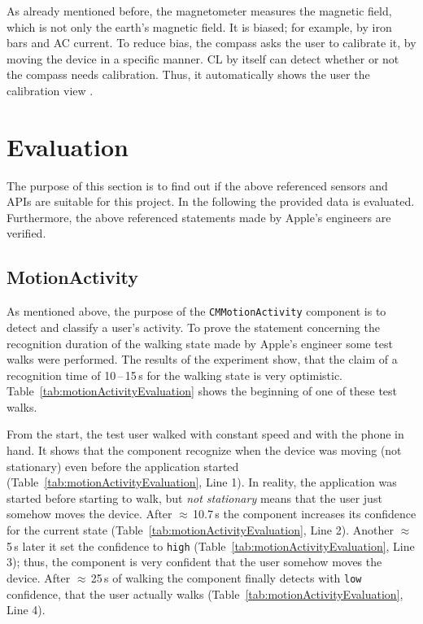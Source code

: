 As already mentioned before, the magnetometer measures the magnetic field, which is not only the earth's magnetic field. It is biased; for example, by iron bars and AC current. To reduce bias, the compass asks the user to calibrate it, by moving the device in a specific manner. \ac{CL} by itself can detect whether or not the compass needs calibration. Thus, it automatically shows the user the calibration view \citep{apple:ios_doc_cl}.


\section{Evaluation}\label{sec:sensor_eval}
The purpose of this section is to find out if the above referenced sensors and \acsp{API} are suitable for this project. In the following the provided data is evaluated. Furthermore, the above referenced statements made by Apple's engineers are verified.


\subsection{MotionActivity}
As mentioned above, the purpose of the \texttt{CMMotionActivity} component is to detect and classify a user's activity. To prove the statement concerning the recognition duration of the walking state made by Apple's engineer \citet{apple:wwdc_2014_pham} some test walks were performed. The results of the experiment show, that the claim of a recognition time of 10\,--\,15\,s for the walking state is very optimistic. Table~\ref{tab:motionActivityEvaluation} shows the beginning of one of these test walks.

From the start, the test user walked with constant speed and with the phone in hand. It shows that the component recognize when the device was moving (not stationary) even before the application started (Table~\ref{tab:motionActivityEvaluation}, Line 1). In reality, the application was started before starting to walk, but \emph{not stationary} means that the user just somehow moves the device. After $\approx$\,10.7\,s the component increases its confidence for the current state (Table~\ref{tab:motionActivityEvaluation}, Line 2). Another $\approx$\,5\,s later it set the confidence to \texttt{high} (Table~\ref{tab:motionActivityEvaluation}, Line 3); thus, the component is very confident that the user somehow moves the device. After $\approx$\,25\,s of walking the component finally detects with \texttt{low} confidence, that the user actually walks (Table~\ref{tab:motionActivityEvaluation}, Line 4).


